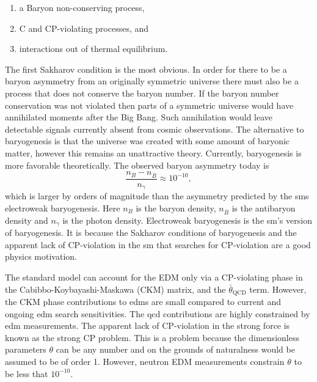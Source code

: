 \begin{enumerate}
    \item a Baryon non-conserving process,
    \item C and CP-violating processes, and 
    \item interactions out of thermal equilibrium.
\end{enumerate}

The first Sakharov condition is the most obvious. In order for there to be a baryon asymmetry from an originally symmetric universe there must also be a process that does not conserve the baryon number. If the baryon number conservation was not violated then parts of a symmetric universe would have annihilated moments after the Big Bang. Such annihilation would leave detectable signals currently absent from cosmic observations. The alternative to baryogenesis is that the universe was created with some amount of baryonic matter, however this remains an unattractive theory. Currently, baryogenesis is more favorable theoretically. The observed baryon asymmetry today is
\begin{equation}
    \frac{n_B- n_{\overline{B}}}{n_\gamma} \approx 10^{-10},
\end{equation}
which is larger by orders of magnitude than the asymmetry predicted by the \gls{sm}s electroweak baryogenesis. Here $n_B$ is the baryon density, $n_{\overline{B}}$ is the antibaryon density and $n_\gamma$ is the photon density.  Electroweak baryogenesis is the \gls{sm}'s version of baryogenesis. It is because the Sakharov conditions of baryogenesis and the apparent lack of CP-violation in the \gls{sm} that searches for CP-violation are a good physics motivation.

The standard model can account for the EDM only via a CP-violating phase in the Cabibbo-Koybayashi-Maskawa (CKM) matrix, and the $\bar{\theta}_{\textrm{QCD}}$ term. However, the CKM phase contributions to \gls{edm}s are small compared to current and ongoing \gls{edm} search sensitivities. The \gls{qcd} contributions are highly constrained by \gls{edm} measurements. The apparent lack of CP-violation in the strong force is known as the strong CP problem. This is a problem because the dimensionless parameters $\theta$ can be any number and on the grounds of naturalness would be assumed to be of order 1.  However, neutron EDM measurements constrain $\theta$ to be less that $10^{-10}$.

